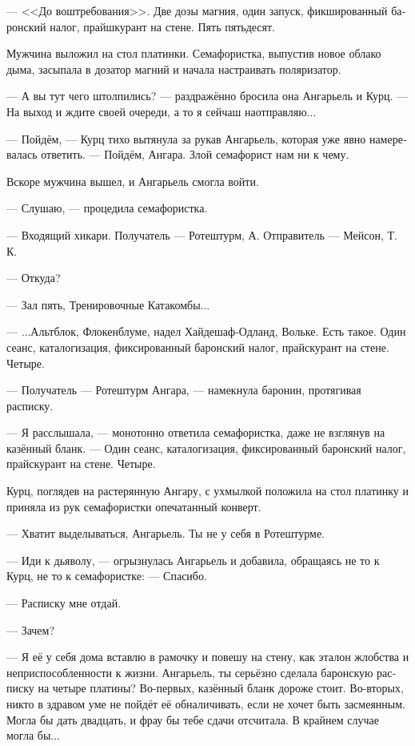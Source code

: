 \documentclass[a4paper,12pt,fleqn]{book}\usepackage{polyglossia}\setdefaultlanguage[babelshorthands=true]{russian}\setotherlanguage{english}\defaultfontfeatures{Ligatures=TeX,Mapping=tex-text}\usepackage{xcolor}\newcommand{\ml}[3]{#2}
\begin{document}
--- <<До воштребования>>.
Две дозы магния, один запуск, фикшированный баронский налог, прайшкурант на стене.
Пять пятьдесят.

Мужчина выложил на стол платинки.
Семафористка, выпустив новое облако дыма, засыпала в дозатор магний и начала настраивать поляризатор.

--- А вы тут чего штолпились? --- раздражённо бросила она Ангарьель и Курц.
--- На выход и ждите своей очереди, а то я сейчаш наотправляю...

--- Пойдём, --- Курц тихо вытянула за рукав Ангарьель, которая уже явно намеревалась ответить.
--- Пойдём, Ангара.
Злой семафорист нам ни к чему.

Вскоре мужчина вышел, и Ангарьель смогла войти.

--- Слушаю, --- процедила семафористка.

--- Входящий хикари.
Получатель --- Ротештурм, А.
Отправитель --- Мейсон, Т. К.

--- Откуда?

--- Зал пять, Тренировочные Катакомбы...

--- ...Альтблок, Флокенблуме, надел Хайдешаф-Одланд, Вольке.
Есть такое.
Один сеанс, каталогизация, фиксированный баронский налог, прайскурант на стене.
Четыре.

--- Получатель --- Ротештурм Ангара, --- намекнула баронин, протягивая расписку.

--- Я расслышала, --- монотонно ответила семафористка, даже не взглянув на казённый бланк.
--- Один сеанс, каталогизация, фиксированный баронский налог, прайскурант на стене.
Четыре.

Курц, поглядев на растерянную Ангару, с ухмылкой положила на стол платинку и приняла из рук семафористки опечатанный конверт.

--- Хватит выделываться, Ангарьель.
Ты не у себя в Ротештурме.

--- Иди к дьяволу, --- огрызнулась Ангарьель и добавила, обращаясь не то к Курц, не то к семафористке:
--- Спасибо.

--- Расписку мне отдай.

--- Зачем?

--- Я её у себя дома вставлю в рамочку и повешу на стену, как эталон жлобства и неприспособленности к жизни.
Ангарьель, ты серьёзно сделала баронскую расписку на четыре платины?
Во-первых, казённый бланк дороже стоит.
Во-вторых, никто в здравом уме не пойдёт её обналичивать, если не хочет быть засмеянным.
Могла бы дать двадцать, и фрау бы тебе сдачи отсчитала.
В крайнем случае могла бы...
\end{document}
